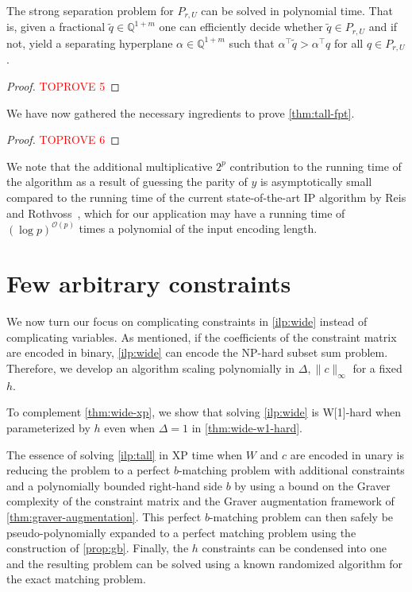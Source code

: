 \documentclass[a4paper,UKenglish,cleveref,thm-restate]{lipics-v2021}
\newcommand{\Q}{\mathbb Q}
\renewcommand{\O}{\mathcal O}
\begin{document}
\begin{lemma}
    The strong separation problem for $P_{r,U}$ can be solved in polynomial time. That is, given a fractional $\tilde q\in\Q^{1+m}$ one can efficiently decide whether $\tilde q\in P_{r,U}$ and if not, yield a separating hyperplane $\alpha\in\Q^{1+m}$ such that $\alpha^\top\tilde q>\alpha^\top q$ for all $q\in P_{r,U}$.
    \label{lemma:separation-oracle}
\end{lemma}

\begin{proof}\textcolor{red}{TOPROVE 5}\end{proof}

We have now gathered the necessary ingredients to prove \cref{thm:tall-fpt}.

\begin{proof}\textcolor{red}{TOPROVE 6}\end{proof}

We note that the additional multiplicative $2^p$ contribution to the running time of the algorithm as a result of guessing the parity of $y$ is asymptotically small compared to the running time of the current state-of-the-art IP algorithm by Reis and Rothvoss~\cite{DBLP:conf/focs/ReisR23}, which for our application may have a running time of $(\log p)^{\O(p)}$ times a polynomial of the input encoding length. 
\section{Few arbitrary constraints}
\label{sec:wide}

We now turn our focus on complicating constraints in \cref{ilp:wide} instead of complicating variables. As mentioned, if the coefficients of the constraint matrix are encoded in binary, \cref{ilp:wide} can encode the NP-hard subset sum problem. Therefore, we develop an algorithm scaling polynomially in $\Delta,\|c\|_\infty$ for a fixed $h$.

\thmwidexp*

To complement \cref{thm:wide-xp}, we show that solving \cref{ilp:wide} is W[1]-hard when parameterized by $h$ even when $\Delta=1$ in \cref{thm:wide-w1-hard}.

The essence of solving \cref{ilp:tall} in XP time when $W$ and $c$ are encoded in unary is reducing the problem to a perfect $b$-matching problem with additional constraints and a polynomially bounded right-hand side $b$ by using a bound on the Graver complexity of the constraint matrix and the Graver augmentation framework of \cref{thm:graver-augmentation}. This perfect $b$-matching problem can then safely be pseudo-polynomially expanded to a perfect matching problem using the construction of \cref{prop:gb}. Finally, the $h$ constraints can be condensed into one and the resulting problem can be solved using a known randomized algorithm for the exact matching problem.
\end{document}
